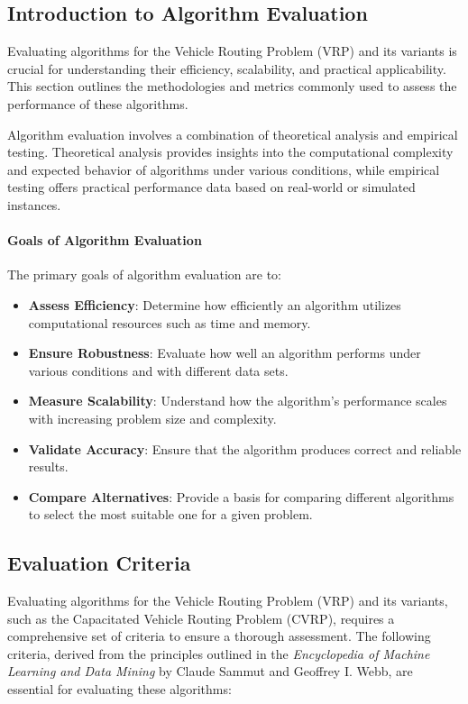 \documentclass[
]{article}
\begin{document}
\subsection{Introduction to Algorithm Evaluation}

  Evaluating algorithms for the Vehicle Routing Problem (VRP) and its variants is crucial for understanding their efficiency, scalability, and practical applicability. This section outlines the methodologies and metrics commonly used to assess the performance of these algorithms.
  
  Algorithm evaluation involves a combination of theoretical analysis and empirical testing. Theoretical analysis provides insights into the computational complexity and expected behavior of algorithms under various conditions, while empirical testing offers practical performance data based on real-world or simulated instances.
  
  \paragraph{Goals of Algorithm Evaluation}
  The primary goals of algorithm evaluation are to:
  \begin{itemize}
      \item \textbf{Assess Efficiency}: Determine how efficiently an algorithm utilizes computational resources such as time and memory.
      \item \textbf{Ensure Robustness}: Evaluate how well an algorithm performs under various conditions and with different data sets.
      \item \textbf{Measure Scalability}: Understand how the algorithm's performance scales with increasing problem size and complexity.
      \item \textbf{Validate Accuracy}: Ensure that the algorithm produces correct and reliable results.
      \item \textbf{Compare Alternatives}: Provide a basis for comparing different algorithms to select the most suitable one for a given problem.
  \end{itemize}
  
  
  \subsection{Evaluation Criteria}

Evaluating algorithms for the Vehicle Routing Problem (VRP) and its variants, such as the Capacitated Vehicle Routing Problem (CVRP), requires a comprehensive set of criteria to ensure a thorough assessment. The following criteria, derived from the principles outlined in the \textit{Encyclopedia of Machine Learning and Data Mining} by Claude Sammut and Geoffrey I. Webb, are essential for evaluating these algorithms:
\end{document}
